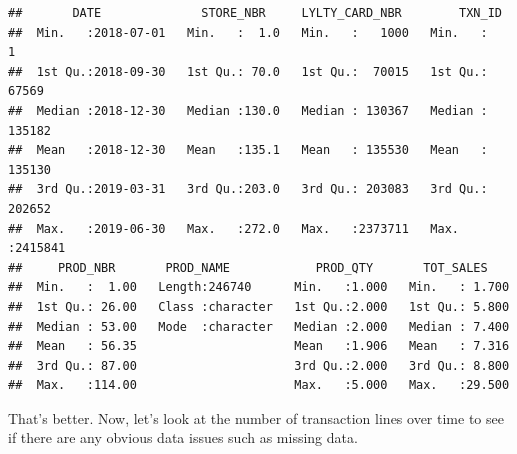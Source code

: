 \documentclass[
]{article}
\newenvironment{Shaded}{\begin{snugshade}}{\end{snugshade}}
\newcommand{\CommentTok}[1]{\textcolor[rgb]{0.56,0.35,0.01}{\textit{#1}}}
\newcommand{\ControlFlowTok}[1]{\textcolor[rgb]{0.13,0.29,0.53}{\textbf{#1}}}
\newcommand{\DecValTok}[1]{\textcolor[rgb]{0.00,0.00,0.81}{#1}}
\newcommand{\DocumentationTok}[1]{\textcolor[rgb]{0.56,0.35,0.01}{\textbf{\textit{#1}}}}
\newcommand{\FunctionTok}[1]{\textcolor[rgb]{0.13,0.29,0.53}{\textbf{#1}}}
\newcommand{\NormalTok}[1]{#1}
\newcommand{\OtherTok}[1]{\textcolor[rgb]{0.56,0.35,0.01}{#1}}
\newcommand{\SpecialCharTok}[1]{\textcolor[rgb]{0.81,0.36,0.00}{\textbf{#1}}}
\begin{document}
\begin{verbatim}
##       DATE              STORE_NBR     LYLTY_CARD_NBR        TXN_ID       
##  Min.   :2018-07-01   Min.   :  1.0   Min.   :   1000   Min.   :      1  
##  1st Qu.:2018-09-30   1st Qu.: 70.0   1st Qu.:  70015   1st Qu.:  67569  
##  Median :2018-12-30   Median :130.0   Median : 130367   Median : 135182  
##  Mean   :2018-12-30   Mean   :135.1   Mean   : 135530   Mean   : 135130  
##  3rd Qu.:2019-03-31   3rd Qu.:203.0   3rd Qu.: 203083   3rd Qu.: 202652  
##  Max.   :2019-06-30   Max.   :272.0   Max.   :2373711   Max.   :2415841  
##     PROD_NBR       PROD_NAME            PROD_QTY       TOT_SALES     
##  Min.   :  1.00   Length:246740      Min.   :1.000   Min.   : 1.700  
##  1st Qu.: 26.00   Class :character   1st Qu.:2.000   1st Qu.: 5.800  
##  Median : 53.00   Mode  :character   Median :2.000   Median : 7.400  
##  Mean   : 56.35                      Mean   :1.906   Mean   : 7.316  
##  3rd Qu.: 87.00                      3rd Qu.:2.000   3rd Qu.: 8.800  
##  Max.   :114.00                      Max.   :5.000   Max.   :29.500
\end{verbatim}

That's better. Now, let's look at the number of transaction lines over
time to see if there are any obvious data issues such as missing data.

\begin{Shaded}
\end{Shaded}
\end{document}
